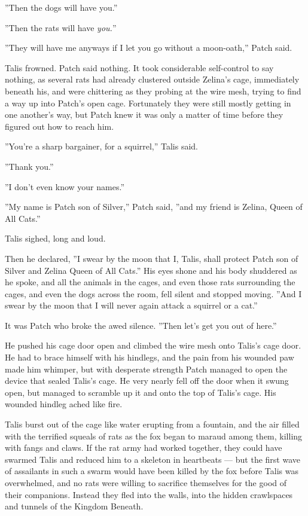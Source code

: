 \documentclass[12pt]{book}
\begin{document}
''Then the dogs will have you.''

''Then the rats will have \textit{you.}''

''They will have me anyways if I let you go without a moon-oath,''
Patch said.

Talis frowned. Patch said nothing. It took considerable self-control
to say nothing, as several rats had already clustered outside Zelina's
cage, immediately beneath his, and were chittering as they probing at
the wire mesh, trying to find a way up into Patch's open
cage. Fortunately they were still mostly getting in one another's way,
but Patch knew it was only a matter of time before they figured out
how to reach him.

''You're a sharp bargainer, for a squirrel,'' Talis said.

''Thank you.''

''I don't even know your names.''

''My name is Patch son of Silver,'' Patch said, ''and my friend is
Zelina, Queen of All Cats.''

Talis sighed, long and loud.

Then he declared, ''I swear by the moon that I, Talis, shall protect
Patch son of Silver and Zelina Queen of All Cats.'' His eyes shone and
his body shuddered as he spoke, and all the animals in the cages, and
even those rats surrounding the cages, and even the dogs across the
room, fell silent and stopped moving. ''And I swear by the moon that I
will never again attack a squirrel or a cat.''

It was Patch who broke the awed silence. ''Then let's get you out of
here.''

He pushed his cage door open and climbed the wire mesh onto Talis's
cage door. He had to brace himself with his hindlegs, and the pain
from his wounded paw made him whimper, but with desperate strength
Patch managed to open the device that sealed Talis's cage. He very
nearly fell off the door when it swung open, but managed to scramble
up it and onto the top of Talis's cage. His wounded hindleg ached like
fire.

Talis burst out of the cage like water erupting from a fountain, and
the air filled with the terrified squeals of rats as the fox began to
maraud among them, killing with fangs and claws. If the rat army had
worked together, they could have swarmed Talis and reduced him to a
skeleton in heartbeats --- but the first wave of assailants in such a
swarm would have been killed by the fox before Talis was overwhelmed,
and no rats were willing to sacrifice themselves for the good of their
companions. Instead they fled into the walls, into the hidden
crawlspaces and tunnels of the Kingdom Beneath.
\end{document}
